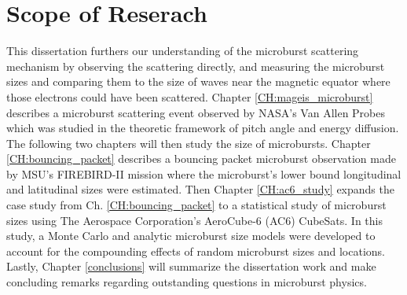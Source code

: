 \section{Scope of Reserach}\label{Intro:scope}
This dissertation furthers our understanding of the microburst scattering mechanism by observing the scattering directly, and measuring the microburst sizes and comparing them to the size of waves near the magnetic equator where those electrons could have been scattered. Chapter \ref{CH:mageis_microburst} describes a microburst scattering event observed by NASA's Van Allen Probes which was studied in the theoretic framework of pitch angle and energy diffusion. The following two chapters will then study the size of microbursts. Chapter \ref{CH:bouncing_packet} describes a bouncing packet microburst observation made by MSU's FIREBIRD-II mission where the microburst's lower bound longitudinal and latitudinal sizes were estimated. Then Chapter \ref{CH:ac6_study} expands the case study from Ch. \ref{CH:bouncing_packet} to a statistical study of microburst sizes using The Aerospace Corporation's AeroCube-6 (AC6) CubeSats. In this study, a Monte Carlo and analytic microburst size models were developed to account for the compounding effects of random microburst sizes and locations. Lastly, Chapter \ref{conclusions} will summarize the dissertation work and make concluding remarks regarding outstanding questions in microburst physics.